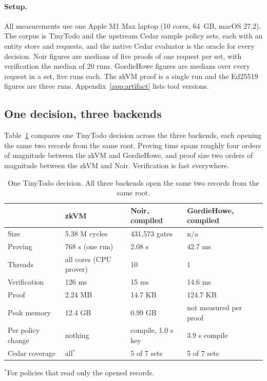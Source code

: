 \documentclass[11pt]{article}
\begin{document}
\paragraph{Setup.} All measurements use one Apple M1 Max laptop (10 cores, 64~GB, macOS 27.2). The corpus is TinyTodo and the upstream Cedar sample policy sets, each with an entity store and requests, and the native Cedar evaluator is the oracle for every decision. Noir figures are medians of five proofs of one request per set, with verification the median of 20 runs. GordieHowe figures are medians over every request in a set, five runs each. The zkVM proof is a single run and the Ed25519 figures are three runs. Appendix~\ref{app:artifact} lists tool versions.

\subsection{One decision, three backends}
\label{sec:one}

Table~\ref{tab:three} compares one TinyTodo decision across the three backends, each opening the same two records from the same root. Proving time spans roughly four orders of magnitude between the zkVM and GordieHowe, and proof size two orders of magnitude between the zkVM and Noir. Verification is fast everywhere.

\begin{table}[t]
\centering
\caption{One TinyTodo decision. All three backends open the same two records from the same root.}
\label{tab:three}
\begin{tabular}{@{}llll@{}}
\toprule
 & zkVM & Noir, compiled & GordieHowe, compiled \\
\midrule
Size & 5.38 M cycles & 431,573 gates & n/a \\
Proving & 768 s (one run) & 2.08 s & 42.7 ms \\
Threads & all cores (CPU prover) & 10 & 1 \\
Verification & 126 ms & 15 ms & 14.6 ms \\
Proof & 2.24 MB & 14.7 KB & 124.7 KB \\
Peak memory & 12.4 GB & 0.99 GB & not measured per proof \\
Per policy change & nothing & compile, 1.0 s key & 3.9 s compile \\
Cedar coverage & all$^{*}$ & 5 of 7 sets & 5 of 7 sets \\
\bottomrule
\end{tabular}

\vspace{3pt}
{\footnotesize $^{*}$For policies that read only the opened records.}
\end{table}
\end{document}
